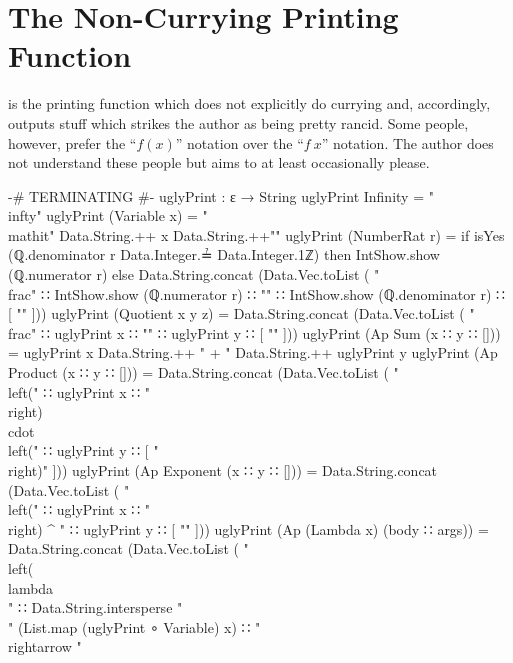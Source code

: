 \documentclass{report}
\begin{document}
\section{The Non-Currying Printing Function}
 is the printing function which does not explicitly do currying and, accordingly, outputs stuff which strikes the author as being pretty rancid.  Some people, however, prefer the ``\(f\left(x\right)\)'' notation over the ``\(f\ x\)'' notation.  The author does not understand these people but aims to at least occasionally please.

\begin{code}
  {-# TERMINATING #-}
  uglyPrint : ε → String
  uglyPrint Infinity = "\\infty"
  uglyPrint (Variable x) = "\\mathit{" Data.String.++ x Data.String.++"}"
  uglyPrint (NumberRat r) =
    if isYes (ℚ.denominator r Data.Integer.≟ Data.Integer.1ℤ)
       then IntShow.show (ℚ.numerator r)
       else Data.String.concat (Data.Vec.toList
              ( "\\frac{"
              ∷ IntShow.show (ℚ.numerator r)
              ∷ "}{"
              ∷ IntShow.show (ℚ.denominator r)
              ∷ [ "}" ]))
  uglyPrint (Quotient x y z) =
    Data.String.concat (Data.Vec.toList
      ( "\\frac{"
      ∷ uglyPrint x
      ∷ "}{"
      ∷ uglyPrint y
      ∷ [ "}" ]))
  uglyPrint (Ap Sum (x ∷ y ∷ [])) =
    uglyPrint x Data.String.++ " + " Data.String.++ uglyPrint y
  uglyPrint (Ap Product (x ∷ y ∷ [])) =
    Data.String.concat (Data.Vec.toList
      ( "\\left("
      ∷ uglyPrint x
      ∷ "\\right) \\cdot \\left("
      ∷ uglyPrint y
      ∷ [ "\\right)" ]))
  uglyPrint (Ap Exponent (x ∷ y ∷ [])) =
    Data.String.concat (Data.Vec.toList
      ( "\\left("
      ∷ uglyPrint x
      ∷ "\\right) ^ {"
      ∷ uglyPrint y
      ∷ [ "}" ]))
  uglyPrint (Ap (Lambda x) (body ∷ args)) =
    Data.String.concat (Data.Vec.toList
      ( "\\left(\\lambda\\ "
      ∷ Data.String.intersperse
          "\\ "
          (List.map (uglyPrint ∘ Variable) x)
      ∷ " \\rightarrow "

\end{code}
\end{document}

